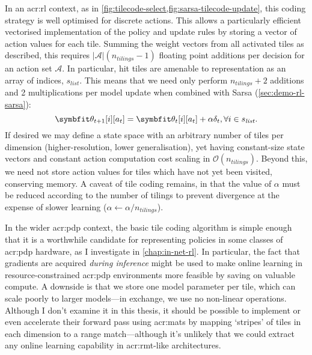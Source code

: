 In an \gls{acr:rl} context, as in \cref{fig:tilecode-select,fig:sarsa-tilecode-update}, this coding strategy is well optimised for discrete actions.
This allows a particularly efficient vectorised implementation of the policy and update rules by storing a vector of action values for each tile.
Summing the weight vectors from all activated tiles as described, this requires  $|\mathcal{A}|(n_{\mathit{tilings}}-1)$ floating point additions per decision for an action set $\mathcal{A}$.
In particular, hit tiles are amenable to representation as an array of indices, $s_{\mathit{list}}$.
This means that we need only perform $n_{\mathit{tilings}} + 2$ additions and \num{2} multiplications per model update when combined with Sarsa (\cref{sec:demo-rl-sarsa}):
\begin{equation}
	\wvec{t+1}[i][a_t] = \wvec{t}[i][a_t] + \alpha \delta_t, \forall i \in s_{\mathit{list}}.
	\label{eqn:sg-sarsa-opt}
\end{equation}
If desired we may define a state space with an arbitrary number of tiles per dimension (higher-resolution, lower generalisation), yet having constant-size state vectors and constant action computation cost scaling in $\mathcal{O}(n_{\mathit{tilings}})$.
Beyond this, we need not store action values for tiles which have not yet been visited, conserving memory.
A caveat of tile coding remains, in that the value of $\alpha$ must be reduced according to the number of tilings to prevent divergence at the expense of slower learning ($\alpha \leftarrow \alpha / n_{\mathit{tilings}}$).

In the wider \gls{acr:pdp} context, the basic tile coding algorithm is simple enough that it is a worthwhile candidate for representing policies in some classes of \gls{acr:pdp} hardware, as I investigate in \cref{chap:in-net-rl}.
In particular, the fact that gradients are acquired \emph{during inference} might be used to make online learning in resource-constrained \gls{acr:pdp} environments more feasible by saving on valuable compute.
A downside is that we store one model parameter per tile, which can scale poorly to larger models---in exchange, we use no non-linear operations.
Although I don't examine it in this thesis, it should be possible to implement or even accelerate their forward pass using \glspl{acr:mat} by mapping `stripes' of tiles in each dimension to a range match---although it's unlikely that we could extract any online learning capability in \gls{acr:rmt}-like architectures.

